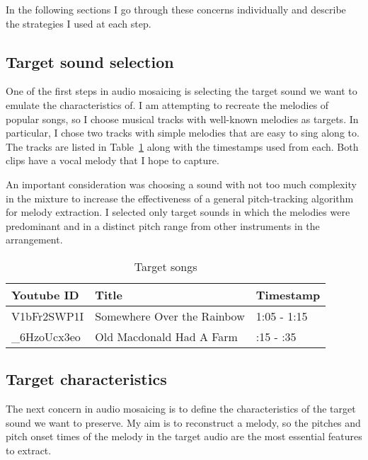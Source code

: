 \documentclass{article}
\begin{document}
In the following sections I go through these concerns individually and describe the strategies I used at each step.

\subsection{Target sound selection}

One of the first steps in audio mosaicing is selecting the target sound we want to emulate the characteristics of. I am attempting to recreate the melodies of popular songs, so I choose musical tracks with well-known melodies as targets. In particular, I chose two tracks with simple melodies that are easy to sing along to. The tracks are listed in Table~\ref{tab:target-songs} along with the timestamps used from each. Both clips have a vocal melody that I hope to capture.

An important consideration was choosing a sound with not too much complexity in the mixture to increase the effectiveness of a general pitch-tracking algorithm for melody extraction. I selected only target sounds in which the melodies were predominant and in a distinct pitch range from other instruments in the arrangement.


\begin{table}
    \begin{center}
    \begin{tabular}{@{}lll@{}}
        \toprule
        Youtube ID & Title & Timestamp \\
        \midrule
        V1bFr2SWP1I & Somewhere Over the Rainbow & 1:05 - 1:15 \\
        \_6HzoUcx3eo & Old Macdonald Had A Farm & :15 - :35 \\
        \bottomrule
    \end{tabular}
    \end{center}
    \caption{Target songs}
    \label{tab:target-songs}
\end{table}


\subsection{Target characteristics}

The next concern in audio mosaicing is to define the characteristics of the target sound we want to preserve. My aim is to reconstruct a melody, so the pitches and pitch onset times of the melody in the target audio are the most essential features to extract.
\end{document}
